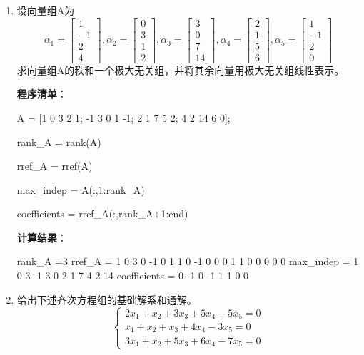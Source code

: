 \documentclass[zihao=-4]{ctexart}
\begin{document}
\begin{enumerate}
\item 设向量组A为
	$$
	\alpha_1=\left[\begin{array}{c}
		1 \\
		-1 \\
		2 \\
		4
	\end{array}\right], \alpha_2=\left[\begin{array}{l}
		0 \\
		3 \\
		1 \\
		2
	\end{array}\right], \alpha_3=\left[\begin{array}{c}
		3 \\
		0 \\
		7 \\
		14
	\end{array}\right], \alpha_4=\left[\begin{array}{l}
		2 \\
		1 \\
		5 \\
		6
	\end{array}\right], \alpha_5=\left[\begin{array}{c}
		1 \\
		-1 \\
		2 \\
		0
	\end{array}\right]
	$$
	求向量组A的秩和一个极大无关组，并将其余向量用极大无关组线性表示。
	
\textbf{程序清单}：
	\begin{mcode}
A = [1 0 3 2 1;
    -1 3 0 1 -1;
    2 1 7 5 2;
    4 2 14 6 0];

rank_A = rank(A)

rref_A = rref(A)

max_indep = A(:,1:rank_A)

coefficients = rref_A(:,rank_A+1:end)
	\end{mcode}
\textbf{计算结果}：
\begin{mcode}
rank_A =3
rref_A =
	 1     0     3     0    -1
     0     1     1     0    -1
     0     0     0     1     1
     0     0     0     0     0
max_indep =
	 1     0     3
    -1     3     0
     2     1     7
     4     2    14
coefficients =
     0    -1
     0    -1
     1     1
     0     0
\end{mcode}	
\item 给出下述齐次方程组的基础解系和通解。
$$
\left\{\begin{array}{c}
	2 x_1+x_2+3 x_3+5 x_4-5 x_5=0 \\
	x_1+x_2+x_3+4 x_4-3 x_5=0 \\
	3 x_1+x_2+5 x_3+6 x_4-7 x_5=0
\end{array}\right.
$$


\end{enumerate}
\end{document}
